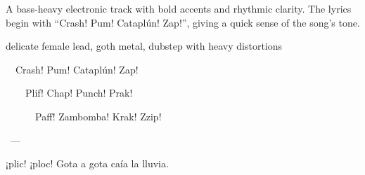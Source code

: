 

\begin{notes}
A bass-heavy electronic track with bold accents and rhythmic clarity. %
The lyrics begin with “Crash! Pum! Cataplún! Zap!”, giving a quick sense of the song’s tone.
\end{notes}

\begin{style}
delicate female lead, goth metal, dubstep with heavy distortions
\end{style}

\begin{lyrics}
  Crash! Pum! Cataplún! Zap!

    Plif! Chap! Punch! Prak!

      Paff! Zambomba! Krak! Zzip!

 ---
 
¡plic! ¡ploc! Gota a gota caía la lluvia.

\end{lyrics}

